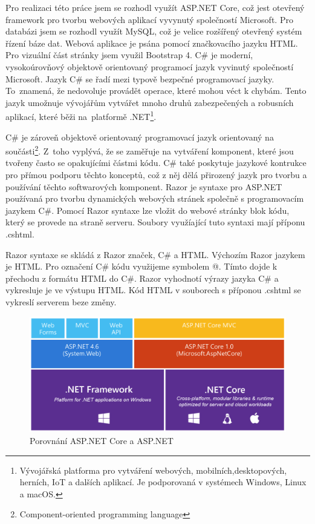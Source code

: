 \documentclass[a4paper, 12pt]{report}
\begin{document}
    Pro realizaci této práce jsem se rozhodl využít ASP.NET Core, což jest otevřený framework pro tvorbu webových aplikací vyvynutý společností Microsoft. Pro databázi jsem se rozhodl využít MySQL, což je velice rozšířený otevřený systém řízení báze dat. Webová aplikace je psána pomocí značkovacího jazyku HTML. Pro vizuální část stránky jsem využil Bootstrap 4.
        C\# je moderní, vysokoúrovňový objektově orientovaný programocí jazyk vyvinutý společností Microsoft. Jazyk C\# se řadí mezi typově bezpečné programovací jazyky. To~znamená, že nedovoluje provádět operace, které mohou véct k chybám. Tento jazyk umožnuje vývojářům vytvářet mnoho druhů zabezpečených a robusních aplikací, které běži na~platformě .NET\footnote{Vývojářská platforma pro vytváření webových, mobilních,desktopových, herních, IoT a dalších aplikací. Je podporovaná v systémech Windows, Linux a macOS.}.\par
        C\# je zároveň objektově orientovaný programovací jazyk orientovaný na součásti\footnote{Component-oriented programming language}. Z~toho vyplývá, že se zaměřuje na vytváření komponent, které jsou tvořeny často se opakujícími částmi kódu. C\# také poskytuje jazykové kontrukce pro přímou podporu těchto konceptů, což z něj dělá přirozený jazyk pro tvorbu a používání těchto softwarových komponent.\cite{CSharp}
		Razor je syntaxe pro ASP.NET používaná pro tvorbu dynamických webových stránek společně s programovacím jazykem C\#. Pomocí Razor syntaxe lze vložit do webové stránky blok kódu, který se provede na straně serveru. Soubory využíající tuto syntaxi mají příponu .cshtml.\par
		Razor syntaxe se skládá z Razor značek, C\# a HTML. Výchozím Razor jazykem je HTML. Pro označení C\# kódu využijeme symbolem @. Tímto dojde k přechodu z formátu HTML do C\#. Razor vyhodnotí výrazy jazyka C\# a vykresluje je ve výstupu HTML. Kód HTML v souborech s příponou .cshtml se vykreslí serverem beze změny.\cite{Razor}
			\begin{figure}[h!]
				\includegraphics[width=\textwidth]{aspnetcore_aspnet}
				\caption{Porovnání ASP.NET Core a ASP.NET \cite{ASPNETCORE_ASPNET}}
				\label{ASP.NET Core a ASP.NET}
			\end{figure}
\end{document}
